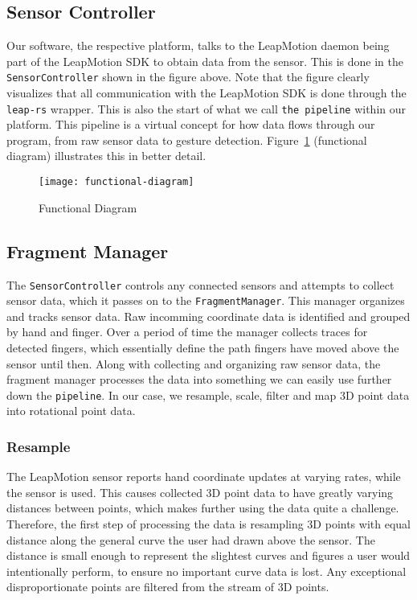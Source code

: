 \documentclass{standalone}
\begin{document}
  \subsection{Sensor Controller}
  Our software, the respective platform, talks to the LeapMotion daemon being
  part of the LeapMotion SDK to obtain data from the sensor. This is done in the
  \verb_SensorController_ shown in the figure above. Note that the figure
  clearly visualizes that all communication with the LeapMotion SDK is done
  through the \verb_leap-rs_ wrapper. This is also the start of what we call
  \verb_the pipeline_ within our platform. This pipeline is a virtual concept
  for how data flows through our program, from raw sensor data to gesture
  detection.
  Figure~\ref{fig:pipeline-diagram} (functional diagram) illustrates this in better
  detail.

  \begin{figure}[h]
    \centering
      \texttt{[image: functional-diagram]}
    \caption{Functional Diagram}
    \label{fig:pipeline-diagram}
  \end{figure}

  \subsection{Fragment Manager}
  The \verb_SensorController_ controls any connected sensors and attempts to
  collect sensor data, which it passes on to the \verb_FragmentManager_. This
  manager organizes and tracks sensor data. Raw incomming coordinate data is
  identified and grouped by hand and finger. Over a period of time the manager
  collects traces for detected fingers, which essentially define the path
  fingers have moved above the sensor until then. Along with collecting and
  organizing raw sensor data, the fragment manager processes the data into
  something we can easily use further down the \verb_pipeline_. In our case, we
  resample, scale, filter and map 3D point data into rotational point data.

  \subsubsection{Resample}
  The LeapMotion sensor reports hand coordinate updates at varying rates, while
  the sensor is used. This causes collected 3D point data to have greatly
  varying distances between points, which makes further using the data quite a
  challenge. Therefore, the first step of processing the data is resampling 3D
  points with equal distance along the general curve the user had drawn above
  the sensor. The distance is small enough to represent the slightest curves and
  figures a user would intentionally perform, to ensure no important curve data
  is lost. Any exceptional disproportionate points are filtered from the stream
  of 3D points.
\end{document}

